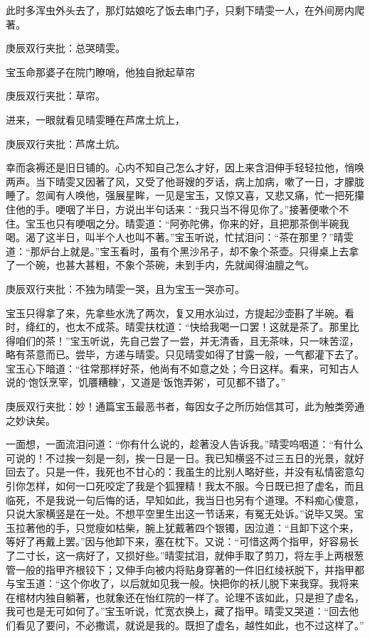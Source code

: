 \begin{parag}
    此时多浑虫外头去了，那灯姑娘吃了饭去串门子，只剩下晴雯一人，在外间房内爬著。\begin{note}庚辰双行夹批：总哭晴雯。\end{note}宝玉命那婆子在院门瞭哨，他独自掀起草帘\begin{note}庚辰双行夹批：草帘。\end{note}进来，一眼就看见晴雯睡在芦席土炕上，\begin{note}庚辰双行夹批：芦席土炕。\end{note}幸而衾褥还是旧日铺的。心内不知自己怎么才好，因上来含泪伸手轻轻拉他，悄唤两声。当下晴雯又因著了风，又受了他哥嫂的歹话，病上加病，嗽了一日，才朦胧睡了。忽闻有人唤他，强展星眸，一见是宝玉，又惊又喜，又悲又痛，忙一把死攥住他的手。哽咽了半日，方说出半句话来：“我只当不得见你了。”接著便嗽个不住。宝玉也只有哽咽之分。晴雯道：“阿弥陀佛，你来的好，且把那茶倒半碗我喝。渴了这半日，叫半个人也叫不著。”宝玉听说，忙拭泪问：“茶在那里？”晴雯道：“那炉台上就是。”宝玉看时，虽有个黑沙吊子，却不象个茶壶。只得桌上去拿了一个碗，也甚大甚粗，不象个茶碗，未到手内，先就闻得油膻之气。\begin{note}庚辰双行夹批：不独为晴雯一哭，且为宝玉一哭亦可。\end{note}宝玉只得拿了来，先拿些水洗了两次，复又用水汕过，方提起沙壶斟了半碗。看时，绛红的，也太不成茶。晴雯扶枕道：“快给我喝一口罢！这就是茶了。那里比得咱们的茶！”宝玉听说，先自己尝了一尝，并无清香，且无茶味，只一味苦涩，略有茶意而已。尝毕，方递与晴雯。只见晴雯如得了甘露一般，一气都灌下去了。宝玉心下暗道：“往常那样好茶，他尚有不如意之处；今日这样。看来，可知古人说的‘饱饫烹宰，饥餍糟糠’，又道是‘饭饱弄粥’，可见都不错了。”\begin{note}庚辰双行夹批：妙！通篇宝玉最恶书者，每因女子之所历始信其可，此为触类旁通之妙诀矣。\end{note}一面想，一面流泪问道：“你有什么说的，趁著没人告诉我。”晴雯呜咽道：“有什么可说的！不过挨一刻是一刻，挨一日是一日。我已知横竖不过三五日的光景，就好回去了。只是一件，我死也不甘心的：我虽生的比别人略好些，并没有私情密意勾引你怎样，如何一口死咬定了我是个狐狸精！我太不服。今日既已担了虚名，而且临死，不是我说一句后悔的话，早知如此，我当日也另有个道理。不料痴心傻意，只说大家横竖是在一处。不想平空里生出这一节话来，有冤无处诉。”说毕又哭。宝玉拉著他的手，只觉瘦如枯柴，腕上犹戴著四个银镯，因泣道：“且卸下这个来，等好了再戴上罢。”因与他卸下来，塞在枕下。又说：“可惜这两个指甲，好容易长了二寸长，这一病好了，又损好些。”晴雯拭泪，就伸手取了剪刀，将左手上两根葱管一般的指甲齐根铰下；又伸手向被内将贴身穿著的一件旧红绫袄脱下，并指甲都与宝玉道：“这个你收了，以后就如见我一般。快把你的袄儿脱下来我穿。我将来在棺材内独自躺著，也就象还在怡红院的一样了。论理不该如此，只是担了虚名，我可也是无可如何了。”宝玉听说，忙宽衣换上，藏了指甲。晴雯又哭道：“回去他们看见了要问，不必撒谎，就说是我的。既担了虚名，越性如此，也不过这样了。”
\end{parag}


